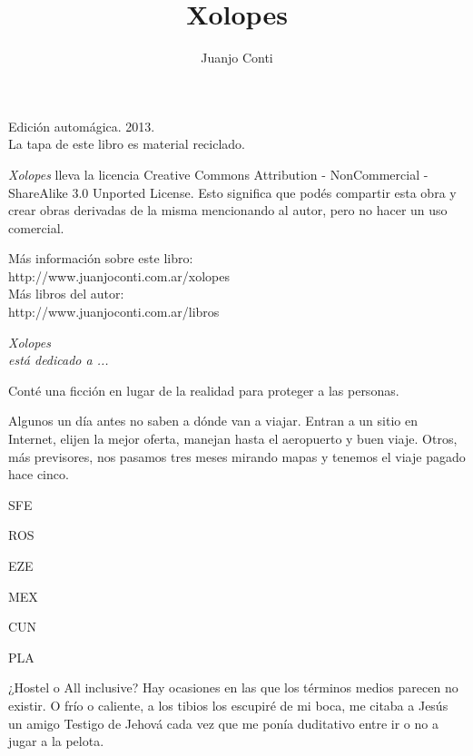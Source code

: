 \documentclass[11pt,twoside,openright,a6paper]{book}
\title{Xolopes}
\author{Juanjo Conti}
\date{}
\begin{document}
\pagestyle{plain}

\maketitle

\cleardoublepage

\thispagestyle{empty}
\noindent
Edición automágica. 2013.\\
La tapa de este libro es material reciclado.

\vspace{0.5cm}

\noindent
\emph{Xolopes} lleva la licencia 
Creative Commons Attribution - NonCommercial - ShareAlike 3.0 Unported License.
Esto significa que podés compartir esta obra y crear obras derivadas de la misma
mencionando al autor, pero no ha\-cer un uso comercial.

\vfill

\noindent
Más información sobre este libro:\\
http://www.juanjoconti.com.ar/xolopes\\

\noindent
Más libros del autor:\\
http://www.juanjoconti.com.ar/libros

\cleardoublepage

\noindent
\begin{flushright}
\emph{
\emph{Xolopes}\\
está dedicado a ...
}
\end{flushright}

\cleardoublepage


\vspace{1.5cm}
Conté una ficción en lugar de la realidad para proteger a las personas.


\vspace{1.5cm}
Algunos un día antes no saben a dónde van a viajar. Entran a un sitio en Internet, elijen la mejor oferta, manejan hasta el aeropuerto y buen viaje. Otros, más previsores, nos pasamos tres meses mirando mapas y tenemos el viaje pagado hace cinco.


\vspace{1.5cm}
SFE

ROS

EZE

MEX

CUN

PLA


\vspace{1.5cm}
¿Hostel o All inclusive? Hay ocasiones en las que los términos medios parecen no existir. O frío o caliente, a los tibios los escupiré de mi boca, me citaba a Jesús un amigo Testigo de Jehová cada vez que me ponía duditativo entre ir o no a jugar a la pelota.
\end{document}
